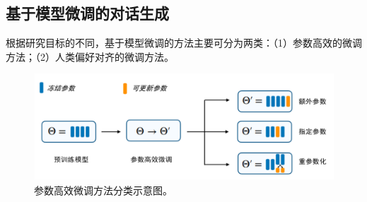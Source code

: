 \subsection{基于模型微调的对话生成}

根据研究目标的不同，基于模型微调的方法主要可分为两类：（1）参数高效的微调方法；（2）人类偏好对齐的微调方法。

\begin{figure}[htbp]
	\centering
	\includegraphics[scale=0.65]{Fig/delta-tuning.png}
	\caption{\label{delta_tuning}参数高效微调方法分类示意图\cite{DBLP:journals/corr/abs-2203-06904}。}
\end{figure}

